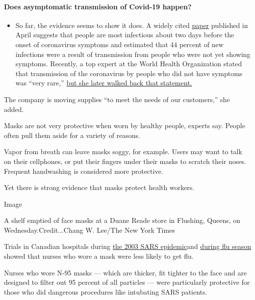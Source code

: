 \begin{itemize}
{  \paragraph{Does asymptomatic transmission of Covid-19
  happen?}\label{does-asymptomatic-transmission-of-covid-19-happen}}

  \begin{itemize}
  \tightlist
  \item
    So far, the evidence seems to show it does. A widely cited
    \href{https://www.nature.com/articles/s41591-020-0869-5}{paper}
    published in April suggests that people are most infectious about
    two days before the onset of coronavirus symptoms and estimated that
    44 percent of new infections were a result of transmission from
    people who were not yet showing symptoms. Recently, a top expert at
    the World Health Organization stated that transmission of the
    coronavirus by people who did not have symptoms was ``very rare,''
    \href{https://www.nytimes3xbfgragh.onion/2020/06/09/world/coronavirus-updates.html?action=click\&pgtype=Article\&state=default\&region=MAIN_CONTENT_3\&context=storylines_faq\#link-1f302e21}{but
    she later walked back that statement.}
  \end{itemize}
\end{itemize}

The company is moving supplies ``to meet the needs of our customers,''
she added.

Masks are not very protective when worn by healthy people, experts say.
People often pull them aside for a variety of reasons.

Vapor from breath can leave masks soggy, for example. Users may want to
talk on their cellphones, or put their fingers under their masks to
scratch their noses. Frequent handwashing is considered more protective.

Yet there is strong evidence that masks protect health workers.

Image

A shelf emptied of face masks at a Duane Reade store in Flushing,
Queens, on Wednesday.Credit...Chang W. Lee/The New York Times

Trials in Canadian hospitals during
\href{https://www.ncbi.nlm.nih.gov/pmc/articles/PMC3322898/}{the 2003
SARS epidemic}and
\href{https://jamanetwork.com/journals/jama/fullarticle/184819}{during
flu season} showed that nurses who wore a mask were less likely to get
flu.

Nurses who wore N-95 masks --- which are thicker, fit tighter to the
face and are designed to filter out 95 percent of all particles --- were
particularly protective for those who did dangerous procedures like
intubating SARS patients.


